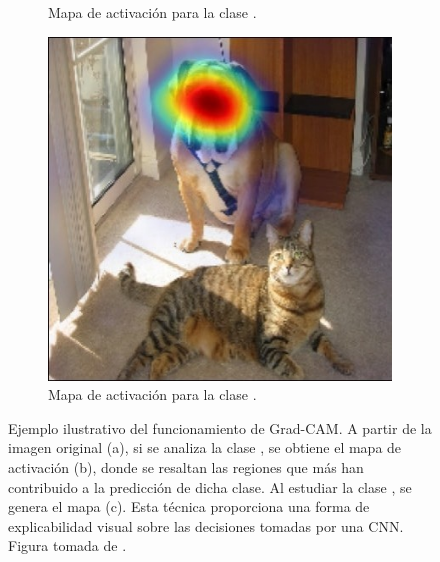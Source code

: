 \begin{figure}[h]
\begin{subfigure}{0.28\textwidth}
        \caption{Mapa de activación para la clase .}
        \label{fig__grad_cam__cat}
    \end{subfigure}  
    \begin{subfigure}{0.28\textwidth}
        \includegraphics[width=\textwidth]{figures/2_theory/grad_cam__dog.jpg}
        \caption{Mapa de activación para la clase .}
        \label{fig__grad_cam__dog}
    \end{subfigure}    
    \caption[Ejemplo de funcionamiento de Grad-CAM]{Ejemplo ilustrativo del funcionamiento de Grad-CAM. A partir de la imagen original (a), si se analiza la clase , se obtiene el mapa de activación (b), donde se resaltan las regiones que más han contribuido a la predicción de dicha clase. Al estudiar la clase , se genera el mapa (c). Esta técnica proporciona una forma de explicabilidad visual sobre las decisiones tomadas por una CNN. Figura tomada de \cite{selvaraju_grad_cam_2017}.}   
    \label{fig__grad_cam}  
\end{figure}

